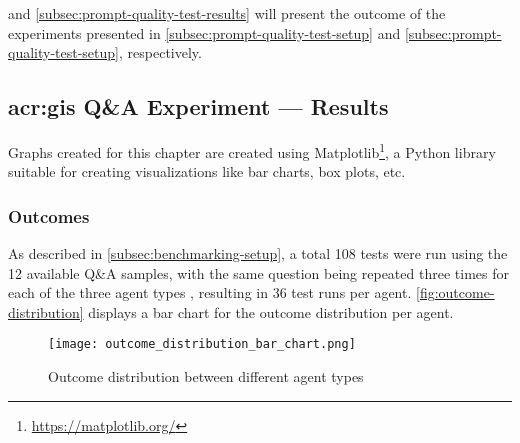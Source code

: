 \begin{comment}
Results should be clearly displayed and should provide a suitable representation of your results for the points you wish to make.
Graphs should be labelled in a legible font. If more than one result is displayed in the same graph, then these should be clearly marked.
Please choose carefully rather than presenting every result. Too much information is hard to read and often hides the key information you wish to present. Make use of statistical methods when presenting results, where possible to strengthen the results.
Further, the format of the presentation of results should be chosen based on what issues in the results you wish to highlight.
You may wish to present a subset in the experimental section and provide additional results in an appendix.
Point out specifics here but save the overall/general discussion to the Discussion chapter.
\end{comment}

 and \autoref{subsec:prompt-quality-test-results} will present the outcome of the experiments presented in \autoref{subsec:prompt-quality-test-setup} and \autoref{subsec:prompt-quality-test-setup}, respectively.


\subsection[GIS Q\&A Experiment --- Results]{\acrshort{acr:gis} Q\&A Experiment --- Results}
\label{subsec:quantitative-results}

Graphs created for this chapter are created using Matplotlib\footnote{\url{https://matplotlib.org/}}, a Python library suitable for creating visualizations like bar charts, box plots, etc.

\subsubsection{Outcomes}

As described in \autoref{subsec:benchmarking-setup}, a total 108 tests were run using the 12 available Q\&A samples, with the same question being repeated three times for each of the three agent types , resulting in 36 test runs per agent. \autoref{fig:outcome-distribution} displays a bar chart for the outcome distribution per agent.


\begin{figure}[htbp]
    \centering
    \texttt{[image: outcome\_distribution\_bar\_chart.png]}
    \caption{Outcome distribution between different agent types}
    \label{fig:outcome-distribution}
\end{figure}

